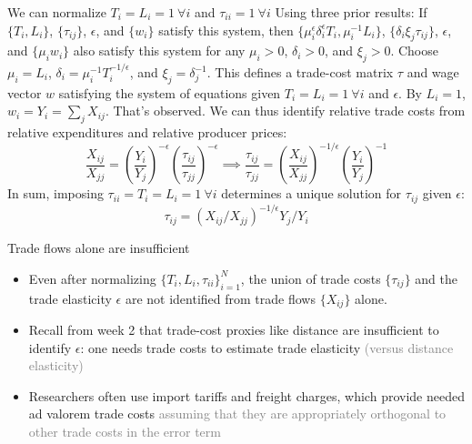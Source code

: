 \documentclass[11pt,notes=hide,aspectratio=169]{beamer}
\begin{document}
\begin{frame}{We can normalize $T_i = L_i = 1 \ \forall i$ and $\tau_{ii} = 1 \ \forall i$}
Using three prior results:
If $\{T_i,L_i\}$, $\{\tau_{ij}\}$, $\epsilon$, and $\{w_i\}$ satisfy this system,
then
$\{\mu_{i}^{\epsilon}\delta_i^{\epsilon} T_i,\mu_{i}^{-1} L_i\}$, $\{\delta_i \xi_j \tau_{ij}\}$, $\epsilon$, and $\{\mu_{i}w_i\}$
also satisfy this system
for any $\mu_{i} > 0$, $\delta_{i} > 0$, and $\xi_j > 0$.
\medskip
Choose
$\mu_{i} =  L_i$,
$\delta_{i}  = \mu_{i}^{-1} T_i^{-1/\epsilon}$,
and
$\xi_j = \delta^{-1}_j$.
This defines a trade-cost matrix $\tau$ and wage vector $w$ satisfying the system of equations 
given $T_i = L_i = 1 \ \forall i$ and $\epsilon$.
\medskip
By $L_i = 1$, $w_i = Y_i = \sum_{j} X_{ij}$.
That's observed.
We can thus identify relative trade costs from relative expenditures and relative producer prices:
$$
\frac{X_{ij}}{X_{jj}} = \left(\frac{Y_i}{Y_j}\right)^{-\epsilon} \left(\frac{\tau_{ij}}{\tau_{jj}}\right)^{-\epsilon}
\implies
\frac{\tau_{ij}}{\tau_{jj}} = \left(\frac{X_{ij}}{X_{jj}}\right)^{-1/\epsilon}\left(\frac{Y_i}{Y_j}\right)^{-1}
$$
\smallskip
In sum, imposing $\tau_{ii} = T_i = L_i = 1 \ \forall i$ determines a unique solution for $\tau_{ij}$ given $\epsilon$:
$$
\tau_{ij} = \left(X_{ij} / X_{jj}\right)^{-1/\epsilon} Y_j / Y_i
$$
\end{frame}
\begin{frame}{Trade flows alone are insufficient}
\begin{itemize}
\item 
Even after normalizing $\{T_i,L_i,\tau_{ii}\}_{i=1}^{N}$,
the union of trade costs $\{\tau_{ij}\}$ and the trade elasticity $\epsilon$
are not identified from trade flows $\{X_{ij}\}$ alone.
\item
Recall from week 2 that trade-cost proxies like distance are insufficient to identify $\epsilon$:
one needs trade costs to estimate trade elasticity \textcolor{gray}{(versus distance elasticity)}
\item
Researchers often use import tariffs and freight charges, which provide needed ad valorem trade costs
\textcolor{gray}{assuming that they are appropriately orthogonal to other trade costs in the error term}
\end{itemize}
\end{frame}
\end{document}
